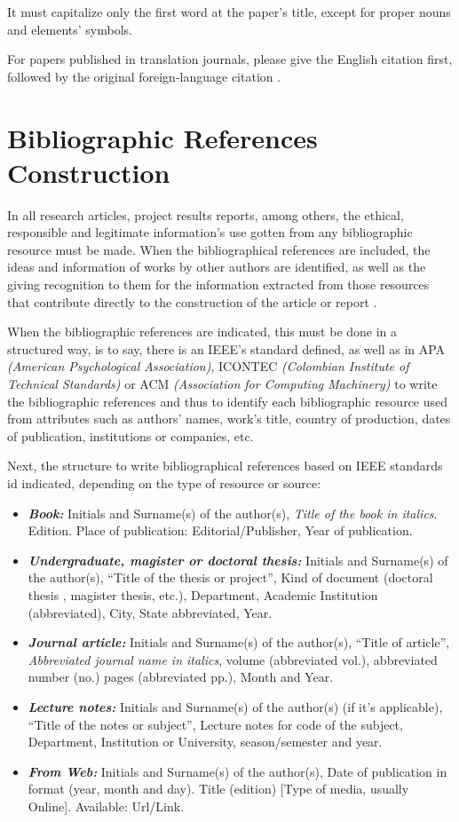 \documentclass[letterpaper, 10pt, conference]{IEEEtran} %
\begin{document}
	It must capitalize only the first word at the paper's title, except for proper nouns and elements' symbols.
	
	For papers published in translation journals, please give the English citation first, followed by the original foreign-language citation \cite{bibliographicReference9}.
	
	\section*{Bibliographic References Construction} \label{sectionBibliographicReferencesConstruction}
	In all research articles, project results reports, among others, the ethical, responsible and legitimate information's use gotten from any bibliographic resource must be made. When the bibliographical references are included, the ideas and information of works by other authors are identified, as well as the giving recognition to them for the information extracted from those resources that contribute directly to the construction of the article or report \cite{bibliographicReference10}.
	
	When the bibliographic references are indicated, this must be done in a structured way, is to say, there is an IEEE's standard defined, as well as in APA \emph{(American Psychological Association)}, ICONTEC \emph{(Colombian Institute of Technical Standards) } or ACM \emph{(Association for Computing Machinery)} to write the bibliographic references and thus to identify each bibliographic resource used from attributes such as authors' names, work's title, country of production, dates of publication, institutions or companies, etc.
	
	Next, the structure to write bibliographical references based on IEEE standards id indicated, depending on the type of resource or source:
	\begin{itemize}
		\item \textbf{\emph{Book:}} Initials and Surname(s) of the author(s), \textit{Title of the book in italics}. Edition. Place of publication: Editorial/Publisher, Year of publication.
		\item \textbf{\emph{Undergraduate, magister or doctoral thesis:}} Initials and Surname(s) of the author(s), ``Title of the thesis or project'', Kind of document (doctoral thesis , magister thesis, etc.), Department, Academic Institution (abbreviated), City, State abbreviated, Year.
		\item \textbf{\emph{Journal article:}} Initials and Surname(s) of the author(s), ``Title of article'', \textit{Abbreviated journal name in italics}, volume (abbreviated vol.), abbreviated number (no.) pages (abbreviated pp.), Month and Year.
		\item \textbf{\emph{Lecture notes:}} Initials and Surname(s) of the author(s) (if it's applicable), ``Title of the notes or subject'', Lecture notes for code of the subject, Department, Institution or University, season/semester and year.
		\item \textbf{\emph{From Web:}} Initials and Surname(s) of the author(s), Date of publication in format (year, month and day). Title (edition) [Type of media, usually Online]. Available: Url/Link.
	\end{itemize}
	
\end{document}
